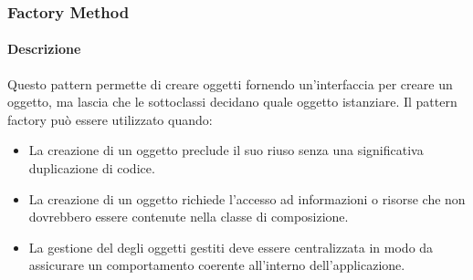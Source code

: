 \newpage
\subsubsection{Factory Method}
\paragraph{Descrizione}
Questo pattern permette di creare oggetti fornendo un'interfaccia per creare un oggetto, ma lascia che le sottoclassi decidano quale oggetto istanziare.
Il pattern factory può essere utilizzato quando:
\begin{itemize}
\item 
La creazione di un oggetto preclude il suo riuso senza una significativa duplicazione di codice.
\item 
La creazione di un oggetto richiede l'accesso ad informazioni o risorse che non dovrebbero essere contenute nella classe di composizione.
\item
La gestione del  degli oggetti gestiti deve essere centralizzata in modo da assicurare un comportamento coerente all'interno dell'applicazione.
\end{itemize}
